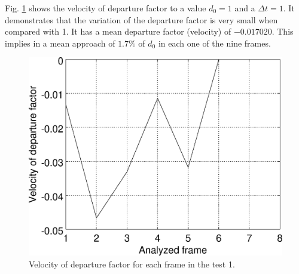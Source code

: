 Fig. \ref{fig:res_graph1v} shows the velocity of departure factor
to a value $d_0=1$ and a $\Delta t=1$. It demonstrates that the variation
of the departure factor is very small when compared with 1. 
It has a mean departure factor (velocity) of $-0.017020$. This implies in a mean approach of $1.7\%$ of $d_0$
in each one of the nine frames.
\begin{figure}[!hbt]
\centering
\includegraphics[width=0.8\columnwidth]{images/graph1v.eps}
\caption{Velocity of departure factor for each frame in the test 1.}
\label{fig:res_graph1v}
\end{figure}


